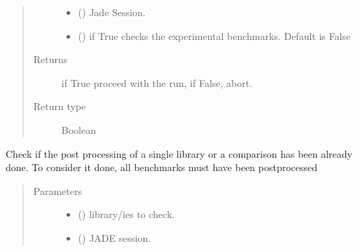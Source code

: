 \documentclass[letterpaper,10pt,english]{sphinxmanual}
\begin{document}
\begin{fulllineitems}
\begin{fulllineitems}
\begin{quote}
\begin{description}
\begin{itemize}
\item {} 
\sphinxAtStartPar
{} ({\hyperref[\detokenize{api/initobjects:main.Session}]{}}) \textendash{} Jade Session.

\item {} 
\sphinxAtStartPar
{} () \textendash{} if True checks the experimental benchmarks. Default is False

\end{itemize}

\item[{Returns}] \leavevmode
\sphinxAtStartPar
{} \textendash{} if True proceed with the run, if False, abort.

\item[{Return type}] \leavevmode
\sphinxAtStartPar
Boolean

\end{description}\end{quote}

\end{fulllineitems}


\begin{fulllineitems}
\label{\detokenize{api/initobjects:status.Status.check_pp_single}}
\sphinxAtStartPar
Check if the post processing of a single library or a comparison has
been already done. To consider it done, all benchmarks must have been
post\sphinxhyphen{}processed
\begin{quote}\begin{description}
\item[{Parameters}] \leavevmode\begin{itemize}
\item {} 
\sphinxAtStartPar
{} () \textendash{} library/ies to check.

\item {} 
\sphinxAtStartPar
{} ({\hyperref[\detokenize{api/initobjects:main.Session}]{}}) \textendash{} JADE session.


\end{itemize}
\end{description}
\end{quote}
\end{fulllineitems}
\end{fulllineitems}
\end{document}
